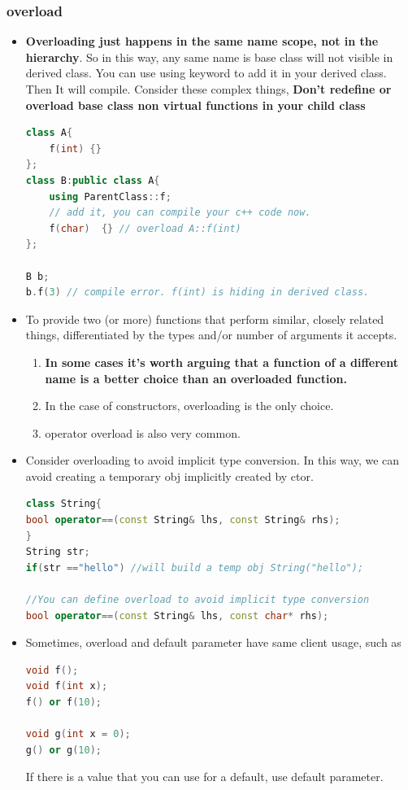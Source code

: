 \documentclass[a4paper,12pt,twoside]{book}
\begin{document}
\subsubsection{overload}
\begin{itemize}

\item  \textbf{Overloading just happens in the same name scope, not in the hierarchy}. So in this way, any same name is base class will not  visible in derived class. You can use using keyword to add it in your derived class. Then It will compile. Consider these complex things, \textbf{Don't redefine or overload base class non virtual functions in your child class}

\begin{lstlisting}[frame=single, language=c++]
class A{
    f(int) {}
};
class B:public class A{
    using ParentClass::f;
    // add it, you can compile your c++ code now.
    f(char)  {} // overload A::f(int)
};

B b;
b.f(3) // compile error. f(int) is hiding in derived class.
\end{lstlisting}

\item To provide two (or more) functions that perform similar, closely related things, differentiated by the types and/or number of arguments it accepts.

\begin{enumerate}
\item \textbf{In some cases it's worth arguing that a function of a different name is a better choice than an overloaded function.}
\item  In the case of constructors, overloading is the only choice.
\item  operator overload is also very common.
\end{enumerate}

\item Consider overloading to avoid implicit type conversion. In this way, we can avoid creating a temporary obj implicitly created by ctor.

\begin{lstlisting}[frame=single, language=c++]
class String{
bool operator==(const String& lhs, const String& rhs);
}
String str;
if(str =="hello") //will build a temp obj String("hello");

//You can define overload to avoid implicit type conversion
bool operator==(const String& lhs, const char* rhs);
\end{lstlisting}


\item Sometimes, overload and default parameter have same client usage, such as
\begin{lstlisting}[frame=single, language=c++]
void f();
void f(int x);
f() or f(10);

void g(int x = 0);
g() or g(10);
\end{lstlisting}
If there is a value that you can use for a default, use default parameter.

\end{itemize}
\end{document}
